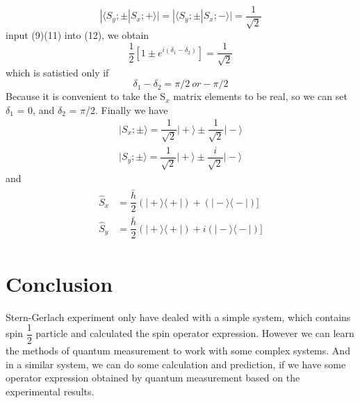 \documentclass[a4paper]{article}
\newcommand{\ket}[1]{\big|  #1 \big \rangle }
\newcommand{\bra}[1]{ \big\langle #1 \big | }
\begin{document}
\begin{equation}
{| \langle S_y; \pm | S_x;+ \rangle |} = {| \langle S_y; \pm | S_x;- \rangle |} = \dfrac{1}{\sqrt{2}}
\end{equation}
input (9)(11) into (12), we obtain
\begin{equation}
\dfrac{1}{2} [ 1 \pm e^{i( \delta_1 - \delta_2)} ] = \dfrac{1}{\sqrt{2}}
\end{equation}
which is satistied only if 
\begin{equation}
\delta_1 - \delta_2 = \pi / 2 \	or	- \pi / 2
\end{equation}
Because it is convenient to take the S$_x$ matrix elements to be real, so we can set $\delta_1$ = 0, and $\delta_2$ = $\pi$/2. Finally we have
\begin{eqnarray}
\ket{S_x;\pm} = \dfrac{1}{\sqrt{2}} \ket{+} \pm \dfrac{1}{\sqrt{2}} \ket{-}\\
\ket{S_y;\pm} = \dfrac{1}{\sqrt{2}} \ket{+} \pm \dfrac{i}{\sqrt{2}} \ket{-}
\end{eqnarray}
and
\begin{eqnarray}
\begin{aligned}
\hat{S}_x &= \dfrac{\bar{h}}{2} (\ket{+} \bra{+}) + (\ket{-} \bra{-}) ]\\
\hat{S}_y &= \dfrac{\bar{h}}{2} (\ket{+} \bra{+}) + i (\ket{-} \bra{-}) ]
\end{aligned}
\end{eqnarray}

\section{Conclusion}
Stern-Gerlach experiment only have dealed with a simple system, which contains spin $\dfrac{1}{2}$ particle and calculated the spin operator expression. However we can learn the methods of quantum measurement to work with some complex systems. And in a similar system, we can do some calculation and prediction, if we have some operator expression obtained by quantum measurement based on the experimental results.


\end{document}

